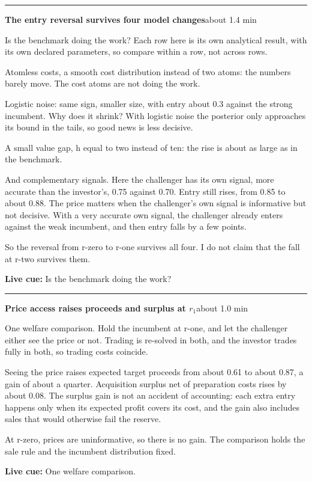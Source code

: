\documentclass[11pt]{article}
\newcommand{\Cue}[1]{\par\nobreak\smallskip\noindent
  \textcolor{ScriptGray}{\footnotesize\textbf{Live cue:} #1}\par}
\newcommand{\scriptframe}[3]{%
  \Needspace{9\baselineskip}%
  \par\medskip\noindent\textcolor{ScriptBlue}{\rule{\linewidth}{0.55pt}}%
  \par\smallskip\noindent
  \textbf{#1}\hfill\textcolor{ScriptGray}{\small #2}\par\smallskip
  #3\par}
\begin{document}
\scriptframe{The entry reversal survives four model changes}{about 1.4 min}{%
  Is the benchmark doing the work? Each row here is its own analytical result,
  with its own declared parameters, so compare within a row, not across rows.

  Atomless costs, a smooth cost distribution instead of two atoms: the numbers
  barely move. The cost atoms are not doing the work.

  Logistic noise: same sign, smaller size, with entry about 0.3 against the
  strong incumbent.
  Why does it shrink? With logistic noise the posterior only approaches its
  bound in the tails, so good news is less decisive.

  A small value gap, h equal to two instead of ten: the rise is about as large
  as in the benchmark.

  And complementary signals. Here the challenger has its own signal, more
  accurate than the investor's, 0.75 against 0.70. Entry still rises, from 0.85
  to about 0.88.
  The price matters when the challenger's own signal is informative but not
  decisive. With a very accurate own signal, the challenger already enters
  against the weak incumbent, and then entry falls by a few points.

  So the reversal from r-zero to r-one survives all four. I do not claim that
  the fall at r-two survives them.
  \Cue{Is the benchmark doing the work?}
}

\scriptframe{Price access raises proceeds and surplus at $r_1$}{about 1.0 min}{%
  One welfare comparison. Hold the incumbent at r-one, and let the challenger
  either see the price or not. Trading is re-solved in both, and the investor
  trades fully in both, so trading costs coincide.

  Seeing the price raises expected target proceeds from about 0.61 to about
  0.87, a gain of about a quarter.
  Acquisition surplus net of preparation costs rises by about 0.08.
  The surplus gain is not an accident of accounting: each extra entry happens
  only when its expected profit covers its cost, and the gain also includes
  sales that would otherwise fail the reserve.

  At r-zero, prices are uninformative, so there is no gain. The comparison
  holds the sale rule and the incumbent distribution fixed.
  \Cue{One welfare comparison.}
}
\end{document}
